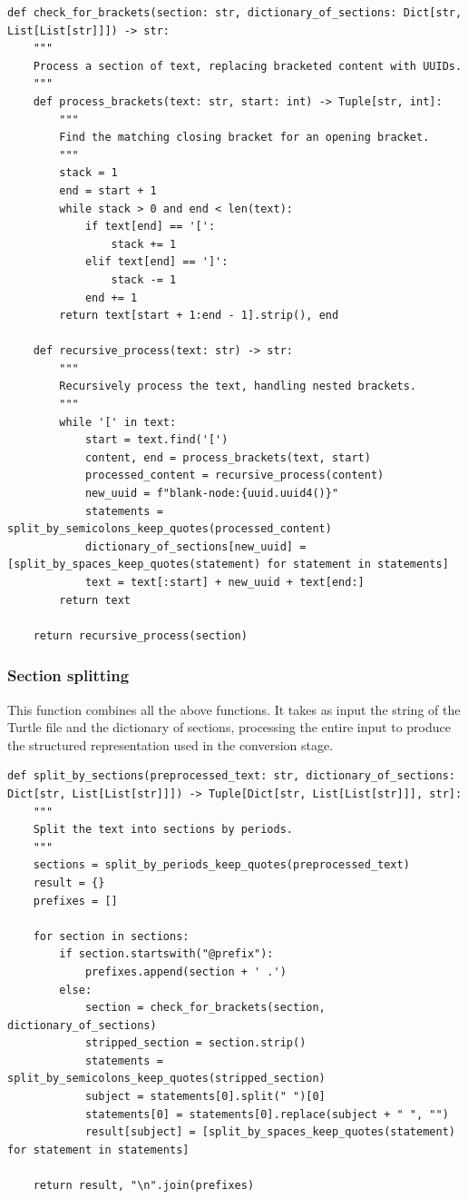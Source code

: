 {\footnotesize
\begin{verbatim}
def check_for_brackets(section: str, dictionary_of_sections: Dict[str, List[List[str]]]) -> str:
    """
    Process a section of text, replacing bracketed content with UUIDs.
    """
    def process_brackets(text: str, start: int) -> Tuple[str, int]:
        """
        Find the matching closing bracket for an opening bracket.
        """
        stack = 1
        end = start + 1
        while stack > 0 and end < len(text):
            if text[end] == '[':
                stack += 1
            elif text[end] == ']':
                stack -= 1
            end += 1
        return text[start + 1:end - 1].strip(), end

    def recursive_process(text: str) -> str:
        """
        Recursively process the text, handling nested brackets.
        """
        while '[' in text:
            start = text.find('[')
            content, end = process_brackets(text, start)
            processed_content = recursive_process(content)
            new_uuid = f"blank-node:{uuid.uuid4()}"
            statements = split_by_semicolons_keep_quotes(processed_content)
            dictionary_of_sections[new_uuid] = [split_by_spaces_keep_quotes(statement) for statement in statements]
            text = text[:start] + new_uuid + text[end:]
        return text

    return recursive_process(section)
\end{verbatim}
}

\subsubsection{Section splitting}
This function combines all the above functions. It takes as input the string of the Turtle file and the dictionary of sections, processing the entire input to produce the structured representation used in the conversion stage.

{\footnotesize
\begin{verbatim}
def split_by_sections(preprocessed_text: str, dictionary_of_sections: Dict[str, List[List[str]]]) -> Tuple[Dict[str, List[List[str]]], str]:
    """
    Split the text into sections by periods.
    """
    sections = split_by_periods_keep_quotes(preprocessed_text)
    result = {}
    prefixes = []

    for section in sections:
        if section.startswith("@prefix"):
            prefixes.append(section + ' .')
        else:
            section = check_for_brackets(section, dictionary_of_sections)
            stripped_section = section.strip()
            statements = split_by_semicolons_keep_quotes(stripped_section)
            subject = statements[0].split(" ")[0]
            statements[0] = statements[0].replace(subject + " ", "")
            result[subject] = [split_by_spaces_keep_quotes(statement) for statement in statements]

    return result, "\n".join(prefixes)
\end{verbatim}
}

